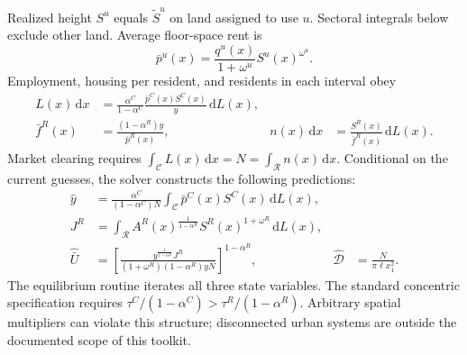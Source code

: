 \documentclass[11pt,a4paper]{article}
\newcommand{\Ubar}{\bar U}
\newcommand{\dens}{\mathcal D}
\newcommand{\dd}{\,\mathrm d}
\newcommand{\Rset}{\mathcal R}
\newcommand{\Cset}{\mathcal C}
\begin{document}
Realized height $S^u$ equals $\widetilde S^u$ on land assigned to use $u$. Sectoral integrals below exclude other land. Average floor-space rent is
\begin{equation}
 \bar p^u(x)=\frac{q^u(x)}{1+\omega^u}S^u(x)^{\omega^u}.\label{eq:rent}
\end{equation}
Employment, housing per resident, and residents in each interval obey
\begin{align}
 L(x)\dd x&=\frac{\alpha^C}{1-\alpha^C}
  \frac{\bar p^C(x)S^C(x)}{y}\dd L(x),\label{eq:labour}\\
 \bar f^R(x)&=\frac{(1-\alpha^R)y}{\bar p^R(x)}, &
 n(x)\dd x&=\frac{S^R(x)}{\bar f^R(x)}\dd L(x).\label{eq:housing}
\end{align}
Market clearing requires $\int_{\Cset}L(x)\dd x=N=\int_{\Rset}n(x)\dd x$. Conditional on the current guesses, the solver constructs the following predictions:
\begin{align}
 \hat y&=\frac{\alpha^C}{(1-\alpha^C)N}
       \int_{\Cset}\bar p^C(x)S^C(x)\dd L(x),\label{eq:yhat}\\
 J^R&=\int_{\Rset}A^R(x)^{\frac1{1-\alpha^R}}
                  S^R(x)^{1+\omega^R}\dd L(x),\label{eq:J}\\
 \widehat{\Ubar}&=\left[\frac{y^{\frac1{1-\alpha^R}}J^R}
 {(1+\omega^R)(1-\alpha^R)yN}\right]^{1-\alpha^R}, &
 \widehat{\dens}&=\frac{N}{\pi\ell x_1^2}.\label{eq:Uhat}
\end{align}
The equilibrium routine iterates all three state variables. The standard concentric specification requires $\tau^C/(1-\alpha^C)>\tau^R/(1-\alpha^R)$. Arbitrary spatial multipliers can violate this structure; disconnected urban systems are outside the documented scope of this toolkit.
\clearpage
\end{document}
